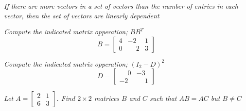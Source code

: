 \documentclass[11pt,letterpaper,boxed]{hmcpset}
\begin{document}
\begin{problem}[Ch 2.1j]
\textit{If there are more vectors in a set of vectors than the number of entries in each vector, then the set of vectors are linearly dependent}
\end{problem}



\pagebreak

\begin{problem}[3.1.8]
\textit{ Compute the indicated matrix opperation; $BB^T$}
$$B=\begin{bmatrix}
4&-2&1\\0&\phantom-2&3
\end{bmatrix}
$$
\end{problem}



\pagebreak

\begin{problem}[3.1.16]
\textit{ Compute the indicated matrix opperation; $(I_2-D)^2$}
$$D=\begin{bmatrix}
\phantom-0&-3\\-2&\phantom-1
\end{bmatrix}$$
\end{problem}



\pagebreak

\begin{problem}[3.1.18]
\textit{Let $A=\begin{bmatrix}
2&1\\6&3
\end{bmatrix}$. Find $2\times 2$ matrices $B$ and $C$ such that $AB= AC$ but $B \neq C$}
\end{problem}


\end{document}
